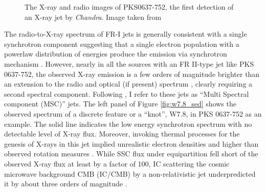 \begin{figure}
    \caption{The X-ray and radio images of PKS0637-752, the first detection of an X-ray jet by \textit{Chandra}. Image taken from \citet{chartas2000chandra}    \label{fig:pks0637-752_show_piece} }
\end{figure}
 The radio-to-X-ray spectrum of FR-I jets is generally consistent with a single synchrotron component \citep[e.g.,][]{Marshall_2002,Hardcastle_2003} suggesting that a single electron population with a powerlaw distribution of energies produce the emission via synchrotron mechanism \citep[for a notable exeception, see][]{meyer2018detection}.  However, nearly in all the sources with an FR II-type jet like PKS 0637-752, the observed X-ray emission is a few orders of magnitude brighter than an extension to the radio and optical (if present) spectrum \citep[e.g.,][]{sambruna2004survey,marshall2005chandra,2011ApJ...730...92H,2011ApJS..193...15M,marshall2018x}, clearly requiring a second spectral component. Following \citep{breiding2017fermi}, I refer to these jets as ``Multi Spectral component (MSC)'' jets. The left panel of Figure \ref{fig:w7.8_sed} shows the observed spectrum of a discrete feature or a ``knot'', W7.8, in PKS 0637-752 as an example. The solid line indicates the low energy synchrotron spectrum with no detectable level of X-ray flux. Moreover, invoking thermal processes for the genesis of X-rays in this jet implied unrealistic electron densities and higher than observed rotation measures \citep{schwartz2000chandra}. While SSC flux under equipartition fell short of the observed X-ray flux at least by a factor of 100, IC scattering the cosmic microwave background CMB (IC/CMB) by a non-relativistic jet underpredicted it by about three orders of magnitude \citep{chartas2000chandra}. 
 
